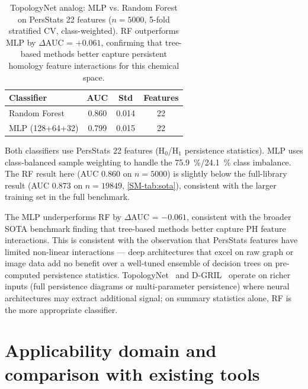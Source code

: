 \documentclass[11pt,a4paper]{article}
\begin{document}
\begin{table}[htbp]
\centering
\caption{TopologyNet analog: MLP vs. Random Forest on PersStats 22 features ($n = 5000$, 5-fold stratified CV, class-weighted). RF outperforms MLP by $\Delta$AUC = $+0.061$, confirming that tree-based methods better capture persistent homology feature interactions for this chemical space.}
\label{tab:topologynet_analog}
\begin{tabularx}{\textwidth}{l S[table-format=1.4] S[table-format=1.4] S[table-format=1.0]}
\toprule
{Classifier} & {AUC} & {Std} & {Features} \\
\midrule
Random Forest & 0.860 & 0.014 & 22 \\
MLP (128+64+32) & 0.799 & 0.015 & 22 \\
\bottomrule
\end{tabularx}
\vspace{1mm}
\footnotesize Both classifiers use PersStats 22 features (H$_0$/H$_1$ persistence statistics). MLP uses class-balanced sample weighting to handle the \qty{75.9}{\percent}/\qty{24.1}{\percent} class imbalance. The RF result here (AUC \num{0.860} on $n = 5000$) is slightly below the full-library result (AUC \num{0.873} on $n = 19849$, \cref{SM-tab:sota}), consistent with the larger training set in the full benchmark.
\end{table}

The MLP underperforms RF by $\Delta$AUC = $-0.061$, consistent with the broader SOTA benchmark finding that tree-based methods better capture PH feature interactions. This is consistent with the observation that PersStats features have limited non-linear interactions --- deep architectures that excel on raw graph or image data add no benefit over a well-tuned ensemble of decision trees on pre-computed persistence statistics. TopologyNet~\citep{topologynet_2018} and D-GRIL~\citep{dgril_2026} operate on richer inputs (full persistence diagrams or multi-parameter persistence) where neural architectures may extract additional signal; on summary statistics alone, RF is the more appropriate classifier.

\vspace{4mm}


\section{Applicability domain and comparison with existing tools}
\label{sec:applicability_comparison}
\end{document}

